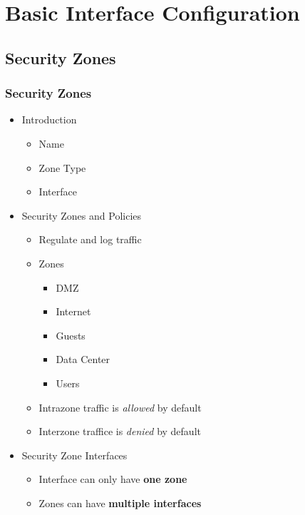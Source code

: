 \section{Basic Interface Configuration}
\subsection{Security Zones}
\subsubsection{Security Zones}
    \begin{itemize}
        \item Introduction 
            \begin{itemize}
                \item Name
                \item Zone Type
                \item Interface
            \end{itemize}
        \item Security Zones and Policies
            \begin{itemize}
                \item Regulate and log traffic
                \item Zones
                    \begin{itemize}
                        \item DMZ
                        \item Internet
                        \item Guests
                        \item Data Center
                        \item Users
                    \end{itemize}
                \item Intrazone traffic is \textit{allowed} by default
                \item Interzone traffice is \textit{denied} by default
            \end{itemize}
        \item Security Zone Interfaces
            \begin{itemize}
                \item Interface can only have \textbf{one zone}
                \item Zones can have \textbf{multiple interfaces}
            \end{itemize}
    \end{itemize}
    
